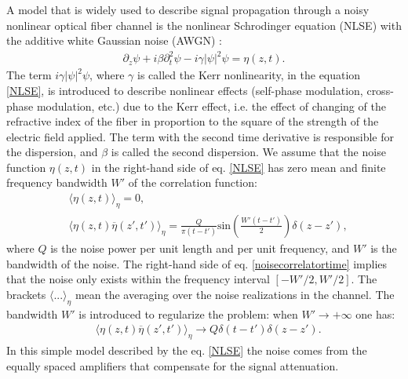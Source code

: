 \documentclass{article}
\begin{document}
A model that is widely used to describe signal propagation through a noisy nonlinear optical fiber channel is the nonlinear Schrodinger equation (NLSE) with the additive white Gaussian noise (AWGN) \cite{haus1991quantum}: 
\begin{align}\label{NLSE}
    \partial_{z}\psi + i\beta\partial^2_{t}\psi - i\gamma|\psi|^2\psi = \eta(z,t).
\end{align}
The term $i\gamma |\psi|^{2}\psi$, where $\gamma$ is called the Kerr nonlinearity, in the equation \eqref{NLSE}, is introduced to describe nonlinear effects (self-phase modulation, cross-phase modulation, etc.) due to the Kerr effect, i.e. the effect of changing of the refractive index of the fiber in proportion to the square of the strength of the electric field applied. The term with the second time derivative is responsible for the dispersion, and $\beta$ is called the second dispersion. We assume that the noise function $\eta(z,t)$ in the right-hand side of eq. \eqref{NLSE} has zero mean and finite frequency bandwidth $W'$ of the correlation function: 
\begin{align}
    &\langle\eta(z,t)\rangle_{\eta}=0,\\
    &\langle\eta(z,t)\overline{\eta}(z',t')\rangle_{\eta}=\frac{Q}{\pi (t-t')}\textrm{sin}\left(\frac{W'(t-t')}{2}\right)\delta(z-z'), \label{noisecorrelatortime}
\end{align}
where $Q$ is the noise power per unit length and per unit frequency, and $W'$ is the bandwidth of the noise. The right-hand side of eq. \eqref{noisecorrelatortime} implies that the noise only exists within the frequency interval $[-W'/2,W'/2]$. The brackets $\langle ... \rangle_{\eta}$ mean the averaging over the noise realizations in the channel. The bandwidth $W'$ is introduced to regularize the problem: when $W' \rightarrow +\infty$ one has:
\begin{eqnarray}
    &\langle\eta(z,t)\overline{\eta}(z',t')\rangle_{\eta}\rightarrow Q \delta(t-t')\delta(z-z').
\end{eqnarray}
In this simple model described by the eq. \eqref{NLSE} the noise comes from the equally spaced amplifiers that compensate for the signal attenuation. 
\end{document}

